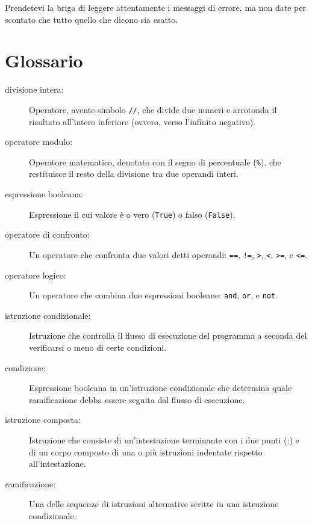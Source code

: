 \documentclass[10pt]{book}
\begin{document}
Prendetevi la briga di leggere attentamente i messaggi di errore, ma non date per scontato che tutto quello che dicono sia esatto.


\section{Glossario}

\begin{description}

\item[divisione intera:] Operatore, avente simbolo {\tt //}, che divide due numeri e arrotonda il risultato all'intero inferiore (ovvero, verso l'infinito negativo).
  
\item[operatore modulo:]  Operatore matematico, denotato con il segno di percentuale ({\tt \%}), che restituisce il resto della divisione tra due operandi
interi.

\item[espressione booleana:]  Espressione il cui valore è o vero 
({\tt True}) o falso ({\tt False}).

\item[operatore di confronto:] Un operatore che confronta due valori detti operandi: {\tt ==}, {\tt !=}, {\tt >}, {\tt <}, {\tt >=}, e {\tt <=}.

\item[operatore logico:] Un operatore che combina due espressioni booleane: {\tt and}, {\tt or}, e {\tt not}.

\item[istruzione condizionale:]  Istruzione che controlla il flusso di esecuzione del programma a seconda del verificarsi o meno di certe condizioni.

\item[condizione:] Espressione booleana in un'istruzione condizionale che      determina quale ramificazione debba essere seguita dal flusso di esecuzione.

\item[istruzione composta:]  Istruzione che consiste di un'intestazione terminante con i due punti (:) e di un corpo composto di una o più istruzioni
indentate rispetto all'intestazione.

\item[ramificazione:] Una delle sequenze di istruzioni alternative scritte in una istruzione condizionale.


\end{description}
\end{document}

